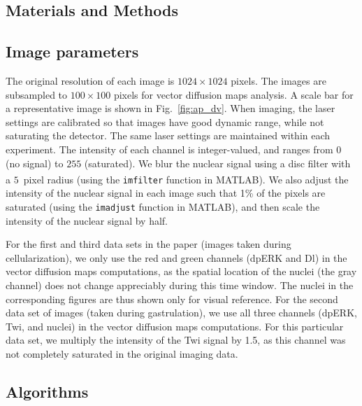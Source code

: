 \documentclass{pnastwo}
\newcommand{\fig}[0]{Fig.}
\begin{document}
\begin{article}


\section{Materials and Methods}

\subsection{Image parameters}

The original resolution of each image is $1024 \times 1024$ pixels.
%
The images are subsampled to $100 \times 100$ pixels for vector diffusion maps analysis.
%
A scale bar for a representative image is shown in \fig~\ref{fig:ap_dv}.
%
When imaging, the laser settings are calibrated so that images have good dynamic range, while not saturating the detector.
%
The same laser settings are maintained within each experiment.
%
The intensity of each channel is integer-valued, and ranges from $0$ (no signal) to $255$ (saturated). 
%
We blur the nuclear signal using a disc filter with a $5$~pixel radius (using the \texttt{imfilter} function in MATLAB\textsuperscript{\textregistered}).
%
We also adjust the intensity of the nuclear signal in each image such that 1\% of the pixels are saturated 
(using the \texttt{imadjust} function in MATLAB), and then scale the intensity of the nuclear signal by half.

For the first and third data sets in the paper (images taken during cellularization), we only use the red and green channels (dpERK and Dl) in the vector diffusion maps computations, as the spatial location of the nuclei (the gray channel) does not change appreciably during this time window.
%
The nuclei in the corresponding figures are thus shown only for visual reference.
%
For the second data set of images (taken during gastrulation), we use all three channels (dpERK, Twi, and nuclei) in the vector diffusion maps computations.
%
For this particular data set, we multiply the intensity of the Twi signal by 1.5, as this channel was not completely saturated in the original imaging data.



\subsection{Algorithms}


\end{article}
\end{document}
